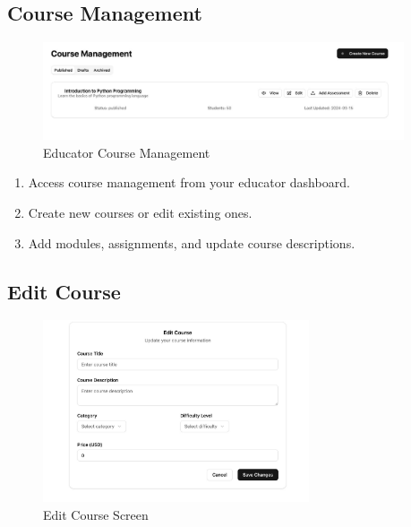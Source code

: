 \documentclass[a4paper,11pt]{scrartcl}
\begin{document}
\subsection{Course Management}
\begin{figure}[H]
    \centering
    \includegraphics[width=0.95\textwidth]{TeacherManageCourse.jpg}
    \caption{Educator Course Management}
\end{figure}
\begin{enumerate}[leftmargin=*]
    \item Access course management from your educator dashboard.
    \item Create new courses or edit existing ones.
    \item Add modules, assignments, and update course descriptions.
\end{enumerate}

\subsection{Edit Course}
\begin{figure}[H]
    \centering
    \includegraphics[width=0.7\textwidth]{TeacherEditCourse.jpg}
    \caption{Edit Course Screen}
\end{figure}
\end{document}
